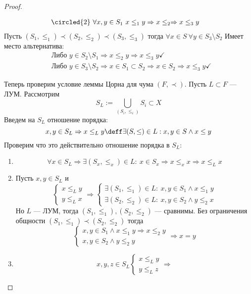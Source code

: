 \begin{proof}
\begin{enumerate}
\begin{align*}
		& \circled{2} \ \forall x,y \in S_1 \ x \leq_1 y \Rightarrow x \leq_2  \Rightarrow x \leq_3 y
	\end{align*}
	Пусть $(S_1, \leq_1) \prec (S_2, \leq_2) \prec (S_3, \leq_3)$ тогда $\forall x \in S \ \forall y \in S_3 \setminus S_2$ Имеет место альтернатива:
	\begin{align*}
		&\text{Либо } y \in S_2 \setminus S_1 \Rightarrow x \leq_2 y \Rightarrow x \leq_3 y \checkmark \\
		&\text{Либо } y \in S_3 \setminus S_2 \Rightarrow x \in S_1 \subset S_2 \Rightarrow x \in S_2 \Rightarrow x \leq_3 y \checkmark
	\end{align*}
\end{enumerate}
	Теперь проверим условие леммы Цорна для чума $(F, \prec)$. Пусть $L \subset F$ --- ЛУМ. Рассмотрим
	$$
	S_L := \bigcup\limits_{(S_i, \leq_i)} S_i \subset X
	$$
	Введем на $S_L$ отношение порядка:
	$$
	x, y \in S_L \Rightarrow x \leq_L y  \deff \exists (S, \leq) \in L: x,y \in S \wedge x \leq y
	$$
	Проверим что это действительно отношение порядка в $S_L$: 
	\begin{enumerate}
		\item 
		$$
		\forall x \in S_L \Rightarrow \exists (S_x, \leq_x) \in L: \ x \in S_x \Rightarrow x \leq_x x \Rightarrow x \leq_L x
		$$
		\item Пусть $x,y \in S_L$ и 
		$$
		\begin{cases}
			x \leq_L y \\
			y \leq_L x
		\end{cases} \Rightarrow
		\begin{cases}
			\exists (S_1, \leq_1) \in L : \ x,y \in S_1 \wedge x \leq_1 y \\
			\exists (S_2, \leq_2) \in L: \ x,y \in S_2 \wedge y \leq_2 x
		\end{cases}
		$$
		Но $L$ --- ЛУМ, тогда $(S_1, \leq_1), (S_2, \leq_2)$ --- сравнимы. Без ограничения общности \newline $(S_1, \leq_1) \prec (S_2, \leq_2)$ тогда
		$$
		\begin{cases}
			x,y \in S_1 \wedge x \leq_1 y \Rightarrow x \leq_2 y \\
			x,y \in S_2 \wedge y \leq_2 y \
		\end{cases} \Rightarrow x = y
		$$ 
		\item 
		$$
		x,y,z \in S_L
		\begin{cases}
			x \leq_L y \\
			y \leq_L z 
		\end{cases}
		\Rightarrow 
$$
\end{enumerate}
\end{proof}

